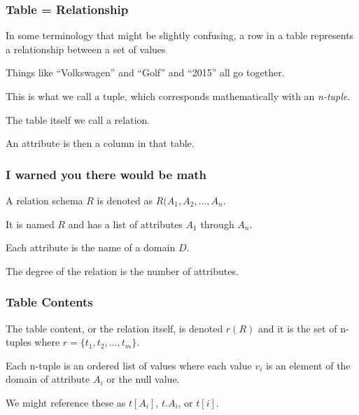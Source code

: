 \begin{frame}
\frametitle{Table = Relationship}

In some terminology that might be slightly confusing, a row in a table represents a \alert{relationship} between a set of values 

Things like ``Volkswagen'' and ``Golf'' and ``2015'' all go together. 

This is what we call a \alert{tuple}, which corresponds mathematically with an \textit{n-tuple}.

The table itself we call a \alert{relation}. 

An \alert{attribute} is then a column in that table. 

\end{frame}



\begin{frame}
\frametitle{I warned you there would be math}

A relation schema $R$ is denoted as $R(A_{1}, A_{2}, ..., A_{n}$. 

It is named $R$ and has a list of attributes $A_{1}$ through $A_{n}$. 

Each attribute is the name of a domain $D$. 

The degree of the relation is the number of attributes. 

\end{frame}



\begin{frame}
\frametitle{Table Contents}

The table content, or the relation itself, is denoted $r(R)$ and it is the set of n-tuples where $r = \{t_{1}, t_{2}, ..., t_{m}\}$. 

Each n-tuple is an ordered list of values where each value $v_{i}$ is an element of the domain of attribute $A_{i}$ or the null value. 

We might reference these as $t[A_{i}]$, $t.A_{i}$, or $t[i]$. 

\end{frame}



